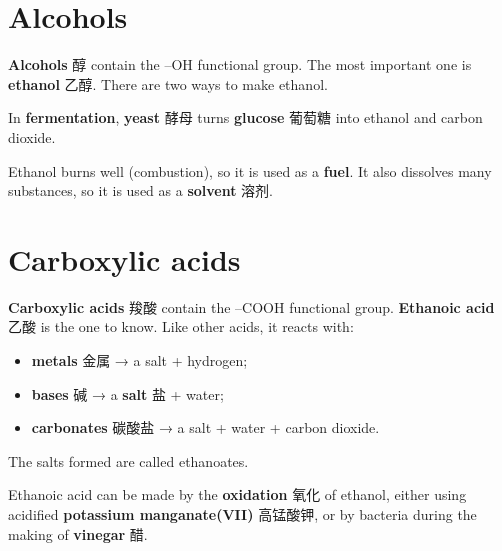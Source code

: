 \documentclass[11pt]{article}
\begin{document}
\section*{Alcohols}

\textbf{Alcohols} 醇 contain the –OH functional group. The most important one is \textbf{ethanol} 乙醇. There are two ways to make ethanol.

\begin{center}
\end{center}

In \textbf{fermentation}, \textbf{yeast} 酵母 turns \textbf{glucose} 葡萄糖 into ethanol and carbon dioxide.

Ethanol burns well (combustion), so it is used as a \textbf{fuel}. It also dissolves many substances, so it is used as a \textbf{solvent} 溶剂.

\section*{Carboxylic acids}

\textbf{Carboxylic acids} 羧酸 contain the –COOH functional group. \textbf{Ethanoic acid} 乙酸 is the one to know. Like other acids, it reacts with:

\begin{itemize}
\item \textbf{metals} 金属 → a salt + hydrogen;

\item \textbf{bases} 碱 → a \textbf{salt} 盐 + water;

\item \textbf{carbonates} 碳酸盐 → a salt + water + carbon dioxide.

\end{itemize}

The salts formed are called ethanoates.

Ethanoic acid can be made by the \textbf{oxidation} 氧化 of ethanol, either using acidified \textbf{potassium manganate(VII)} 高锰酸钾, or by bacteria during the making of \textbf{vinegar} 醋.
\end{document}
